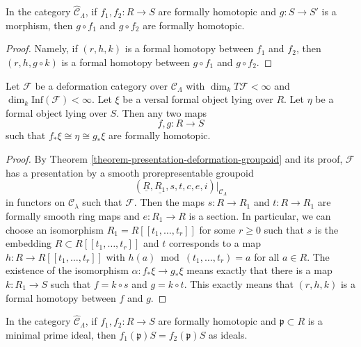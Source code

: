 \begin{lemma}
\label{lemma-composition-homotopic}
In the category $\widehat{\mathcal{C}}_\Lambda$, if $f_1, f_2 : R \to S$
are formally homotopic and $g : S \to S'$ is a morphism, then
$g \circ f_1$ and $g \circ f_2$ are formally homotopic.
\end{lemma}

\begin{proof}
Namely, if $(r, h, k)$ is a formal homotopy between $f_1$ and $f_2$, then
$(r, h, g \circ k)$ is a formal homotopy between $g \circ f_1$ and
$g \circ f_2$.
\end{proof}

\begin{lemma}
\label{lemma-versal-unique-up-to-homotopy}
Let $\mathcal{F}$ be a deformation category over $\mathcal{C}_\Lambda$
with $\dim_k T\mathcal{F} < \infty$ and
$\dim_k \text{Inf}(\mathcal{F}) < \infty$. Let $\xi$ be a versal formal
object lying over $R$. Let $\eta$ be a formal object lying over $S$.
Then any two maps
$$
f, g : R \to S
$$
such that $f_*\xi \cong \eta \cong g_*\xi$ are formally homotopic.
\end{lemma}

\begin{proof}
By Theorem \ref{theorem-presentation-deformation-groupoid}
and its proof, $\mathcal{F}$ has a presentation by
a smooth prorepresentable groupoid
$$
(\underline{R}, \underline{R_1}, s, t, c, e, i)|_{\mathcal{C}_\Lambda}
$$
in functors on $\mathcal{C}_\lambda$ such that $\mathcal{F}$.
Then the maps $s : R \to R_1$ and $t : R \to R_1$ are formally
smooth ring maps and $e : R_1 \to R$ is a section.
In particular, we can choose an isomorphism
$R_1 = R[[t_1, \ldots, t_r]]$ for some $r \geq 0$ such
that $s$ is the embedding $R \subset R[[t_1, \ldots, t_r]]$
and $t$ corresponds to a map $h : R \to R[[t_1, \ldots, t_r]]$
with $h(a) \bmod (t_1, \ldots, t_r) = a$ for all $a \in R$.
The existence of the isomorphism $\alpha : f_*\xi \to g_*\xi$
means exactly that there is a map $k : R_1 \to S$
such that $f = k \circ s$ and $g = k \circ t$.
This exactly means that $(r, h, k)$ is a formal homotopy between
$f$ and $g$.
\end{proof}

\begin{lemma}
\label{lemma-homotopic-minimal-prime}
In the category $\widehat{\mathcal{C}}_\Lambda$, if $f_1, f_2 : R \to S$
are formally homotopic and $\mathfrak p \subset R$ is a minimal
prime ideal, then $f_1(\mathfrak p)S = f_2(\mathfrak p)S$ as ideals.
\end{lemma}

